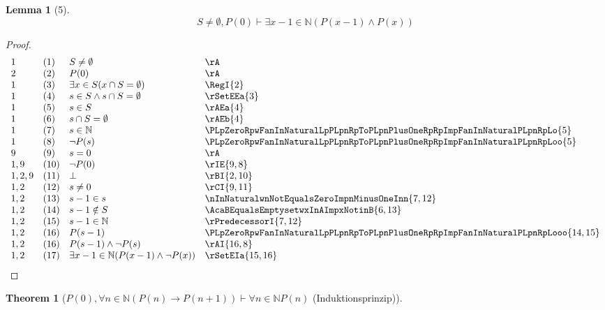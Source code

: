 \documentclass{book}
\theoremstyle{plain}
\newtheorem{theorem}{Theorem}
\newtheorem*{lemma}{Lemma} %
\theoremstyle{remark}
\theoremstyle{definition}
\begin{document}
\label{PLpZeroRpwFanInNaturalLpPLpnRpToPLpnPlusOneRpRpImpFanInNaturalPLpnRpLooooo}
\begin{lemma}[5]
\[S\neq\emptyset, P(0) \vdash \exists x-1\in \mathbb{N} (P(x-1)\land P(x))\]
\end{lemma}
\begin{proof}
	\[
	\begin{array}{llll}
		1 &  (1) & S\neq\emptyset & \rA \\
		2 &  (2) & P(0) & \rA \\	
		1 &  (3) & \exists x\in S(x\cap S=\emptyset) & \RegI{2} \\	
		1 & (4) & s\in S\land s\cap S=\emptyset & \rSetEEa{3} \\
		1 & (5) & s\in S & \rAEa{4} \\
		1 & (6) & s\cap S=\emptyset & \rAEb{4} \\
		1 & (7) & s\in\mathbb{N} & \PLpZeroRpwFanInNaturalLpPLpnRpToPLpnPlusOneRpRpImpFanInNaturalPLpnRpLo{5} \\
		1 & (8) & \neg P(s) & \PLpZeroRpwFanInNaturalLpPLpnRpToPLpnPlusOneRpRpImpFanInNaturalPLpnRpLoo{5} \\
            9 & (9) & s=0 & \rA \\
            1,9 & (10) & \neg P(0) & \rIE{9,8} \\
		1,2,9 & (11) & \bot & \rBI{2,10} \\
		1,2 & (12) & s\neq 0 & \rCI{9,11} \\
            1,2 & (13) & s-1\in s & \nInNaturalwnNotEqualsZeroImpnMinusOneInn{7,12}  \\
            1,2 & (14) & s-1\notin S & \AcaBEqualsEmptysetwxInAImpxNotinB{6,13}  \\
            1,2 & (15) & s-1\in \mathbb{N} & \rPredecessorI{7,12}  \\
            1,2 & (16) & P(s-1)& \PLpZeroRpwFanInNaturalLpPLpnRpToPLpnPlusOneRpRpImpFanInNaturalPLpnRpLooo{14,15}  \\
            1,2 & (16) & P(s-1)\land \neg P(s)& \rAI{16,8}  \\
            1,2 & (17) & \exists x-1\in\mathbb{N} (P(x-1)\land \neg P(x))& \rSetEIa{15,16}  \\           
	\end{array}
	\]
\end{proof}
\label{PLpZeroRpwFanInNaturalLpPLpnRpToPLpnPlusOneRpRpImpFanInNaturalPLpnRp}
\begin{theorem}[\(P(0), \forall n \in \mathbb{N} (P(n) \rightarrow P(n+1)) \vdash \forall n \in \mathbb{N} P(n)\) (Induktionsprinzip)]
\end{theorem}
\end{document}
